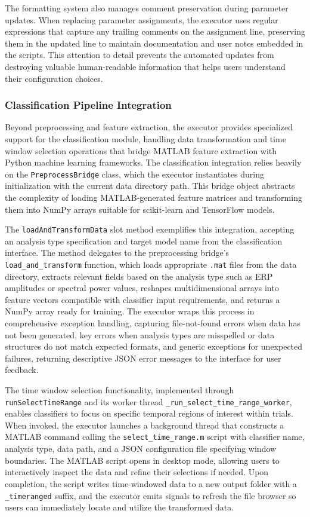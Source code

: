 \documentclass[12pt]{report}
\begin{document}
The formatting system also manages comment preservation during parameter updates. When replacing parameter assignments, the executor uses regular expressions that capture any trailing comments on the assignment line, preserving them in the updated line to maintain documentation and user notes embedded in the scripts. This attention to detail prevents the automated updates from destroying valuable human-readable information that helps users understand their configuration choices.

\subsubsection{Classification Pipeline Integration}

Beyond preprocessing and feature extraction, the executor provides specialized support for the classification module, handling data transformation and time window selection operations that bridge MATLAB feature extraction with Python machine learning frameworks. The classification integration relies heavily on the \verb|PreprocessBridge| class, which the executor instantiates during initialization with the current data directory path. This bridge object abstracts the complexity of loading MATLAB-generated feature matrices and transforming them into NumPy arrays suitable for scikit-learn and TensorFlow models.

The \verb|loadAndTransformData| slot method exemplifies this integration, accepting an analysis type specification and target model name from the classification interface. The method delegates to the preprocessing bridge's \verb|load_and_transform| function, which loads appropriate \verb|.mat| files from the data directory, extracts relevant fields based on the analysis type such as ERP amplitudes or spectral power values, reshapes multidimensional arrays into feature vectors compatible with classifier input requirements, and returns a NumPy array ready for training. The executor wraps this process in comprehensive exception handling, capturing file-not-found errors when data has not been generated, key errors when analysis types are misspelled or data structures do not match expected formats, and generic exceptions for unexpected failures, returning descriptive JSON error messages to the interface for user feedback.

The time window selection functionality, implemented through \verb|runSelectTimeRange| and its worker thread \verb|_run_select_time_range_worker|, enables classifiers to focus on specific temporal regions of interest within trials. When invoked, the executor launches a background thread that constructs a MATLAB command calling the \verb|select_time_range.m| script with classifier name, analysis type, data path, and a JSON configuration file specifying window boundaries. The MATLAB script opens in desktop mode, allowing users to interactively inspect the data and refine their selections if needed. Upon completion, the script writes time-windowed data to a new output folder with a \verb|_timeranged| suffix, and the executor emits signals to refresh the file browser so users can immediately locate and utilize the transformed data.
\end{document}
